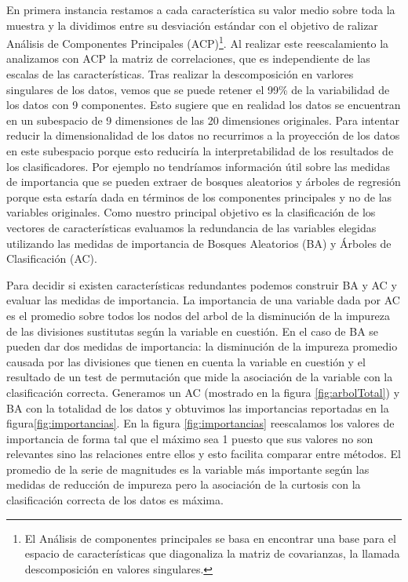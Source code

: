 \documentclass[letterpaper,12pt]{book}
\begin{document}
En primera instancia restamos a cada característica su valor medio sobre toda la muestra y la dividimos entre su desviación estándar con el objetivo de ralizar Análisis de Componentes Principales (ACP)\footnote{El Análisis de componentes principales se basa en encontrar una base para el espacio de características que diagonaliza la matriz de covarianzas, la llamada descomposición en valores singulares.}. Al realizar este reescalamiento la analizamos con ACP la matriz de correlaciones, que es independiente de las escalas de las características. Tras realizar la descomposición en varlores singulares de los datos, vemos que se puede retener el 99\% de la variabilidad de los datos con 9 componentes. Esto sugiere que en realidad los datos se encuentran en un subespacio de 9 dimensiones de las 20 dimensiones originales. Para intentar reducir la dimensionalidad de los datos no recurrimos a la proyección de los datos en este subespacio porque esto reduciría la interpretabilidad de los resultados de los clasificadores. Por ejemplo no tendríamos información útil sobre las medidas de importancia que se pueden extraer de bosques aleatorios y árboles de regresión porque esta estaría dada en términos de los componentes principales y no de las variables originales. Como nuestro principal objetivo es la clasificación de los vectores de características evaluamos la redundancia de las variables elegidas utilizando las medidas de importancia de Bosques  Aleatorios (BA) y Árboles de Clasificación (AC).

Para decidir si existen características redundantes podemos construir BA y AC y evaluar las medidas de importancia. La importancia de una variable dada por AC es el promedio sobre todos los nodos del arbol de la  disminución de la impureza de las divisiones sustitutas según la variable en cuestión. En el caso de BA se pueden dar dos medidas de importancia: la disminución de la impureza promedio causada por las divisiones que tienen en cuenta la variable en cuestión  y el resultado de un test de permutación que mide la asociación de la variable con la clasificación correcta. Generamos un AC (mostrado en la figura \ref{fig:arbolTotal}) y BA con la totalidad de los datos y obtuvimos las importancias reportadas en la figura\ref{fig:importancias}.  En la figura \ref{fig:importancias} reescalamos los valores de importancia de forma tal que el máximo sea 1 puesto que sus valores no son relevantes sino las relaciones entre ellos y esto facilita comparar entre métodos. El promedio de la serie de magnitudes es la variable más importante según las medidas de reducción de impureza pero la asociación de la curtosis con la clasificación correcta de los datos es máxima.
 
\end{document}
